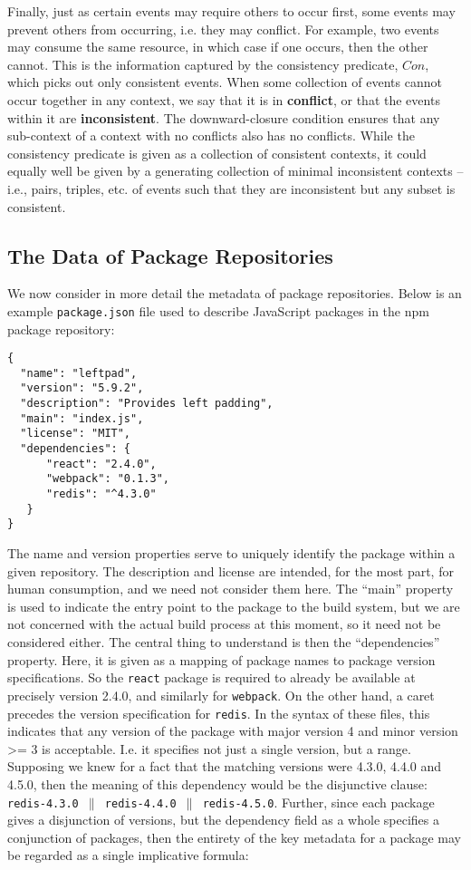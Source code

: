 \documentclass[hoptionsi,review,screen,format=sigconf]{acmart}
\theoremstyle{definition}
\newcommand{\bor}{\mathop{\|}}
\begin{document}
Finally, just as certain events may require others to occur first, some events may prevent others from occurring, i.e. they may conflict. For example, two events may consume the same resource, in which case if one occurs, then the other cannot. This is the information captured by the consistency predicate, \(Con\), which picks out only consistent events. When some collection of events cannot occur together in any context, we say that it is in \textbf{conflict}, or that the events within it are \textbf{inconsistent}. The downward-closure condition ensures that any sub-context of a context with no conflicts also has no conflicts. While the consistency predicate is given as a collection of consistent contexts, it could equally well be given by a generating collection of minimal inconsistent contexts -- i.e., pairs, triples, etc. of events such that they are inconsistent but any subset is consistent.

\subsection{The Data of Package Repositories}

We now consider in more detail the metadata of package repositories. Below is an example \texttt{package.json} file used to describe JavaScript packages in the npm package repository:

\begin{verbatim}
{
  "name": "leftpad", 
  "version": "5.9.2", 
  "description": "Provides left padding",
  "main": "index.js",
  "license": "MIT",
  "dependencies": {
      "react": "2.4.0",
      "webpack": "0.1.3",
      "redis": "^4.3.0"
   }
}
\end{verbatim}

The name and version properties serve to uniquely identify the package within a given repository. The description and license are intended, for the most part, for human consumption, and we need not consider them here. The ``main'' property is used to indicate the entry point to the package to the build system, but we are not concerned with the actual build process at this moment, so it need not be considered either. The central thing to understand is then the ``dependencies'' property. Here, it is given as a mapping of package names to package version specifications. So the \texttt{react} package is required to already be available at precisely version 2.4.0, and similarly for \texttt{webpack}. On the other hand, a caret precedes the version specification for \texttt{redis}. In the syntax of these files, this indicates that any version of the package with major version 4 and minor version >= 3 is acceptable. I.e. it specifies not just a single version, but a range. Supposing we knew for a fact that the matching versions were 4.3.0, 4.4.0 and 4.5.0, then the meaning of this dependency would be the disjunctive clause: \texttt{redis-4.3.0 $\bor$ redis-4.4.0 $\bor$ redis-4.5.0}. Further, since each package gives a disjunction of versions, but the dependency field as a whole specifies a conjunction of packages, then the entirety of the key metadata for a package may be regarded as a single implicative formula:
\end{document}
